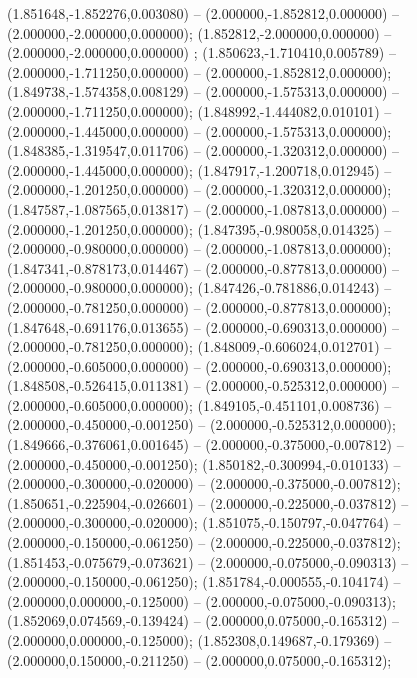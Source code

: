  (1.851648,-1.852276,0.003080) -- (2.000000,-1.852812,0.000000) -- (2.000000,-2.000000,0.000000);
 (1.852812,-2.000000,0.000000) -- (2.000000,-2.000000,0.000000) ;
 (1.850623,-1.710410,0.005789) -- (2.000000,-1.711250,0.000000) -- (2.000000,-1.852812,0.000000);
 (1.849738,-1.574358,0.008129) -- (2.000000,-1.575313,0.000000) -- (2.000000,-1.711250,0.000000);
 (1.848992,-1.444082,0.010101) -- (2.000000,-1.445000,0.000000) -- (2.000000,-1.575313,0.000000);
 (1.848385,-1.319547,0.011706) -- (2.000000,-1.320312,0.000000) -- (2.000000,-1.445000,0.000000);
 (1.847917,-1.200718,0.012945) -- (2.000000,-1.201250,0.000000) -- (2.000000,-1.320312,0.000000);
 (1.847587,-1.087565,0.013817) -- (2.000000,-1.087813,0.000000) -- (2.000000,-1.201250,0.000000);
 (1.847395,-0.980058,0.014325) -- (2.000000,-0.980000,0.000000) -- (2.000000,-1.087813,0.000000);
 (1.847341,-0.878173,0.014467) -- (2.000000,-0.877813,0.000000) -- (2.000000,-0.980000,0.000000);
 (1.847426,-0.781886,0.014243) -- (2.000000,-0.781250,0.000000) -- (2.000000,-0.877813,0.000000);
 (1.847648,-0.691176,0.013655) -- (2.000000,-0.690313,0.000000) -- (2.000000,-0.781250,0.000000);
 (1.848009,-0.606024,0.012701) -- (2.000000,-0.605000,0.000000) -- (2.000000,-0.690313,0.000000);
 (1.848508,-0.526415,0.011381) -- (2.000000,-0.525312,0.000000) -- (2.000000,-0.605000,0.000000);
 (1.849105,-0.451101,0.008736) -- (2.000000,-0.450000,-0.001250) -- (2.000000,-0.525312,0.000000);
 (1.849666,-0.376061,0.001645) -- (2.000000,-0.375000,-0.007812) -- (2.000000,-0.450000,-0.001250);
 (1.850182,-0.300994,-0.010133) -- (2.000000,-0.300000,-0.020000) -- (2.000000,-0.375000,-0.007812);
 (1.850651,-0.225904,-0.026601) -- (2.000000,-0.225000,-0.037812) -- (2.000000,-0.300000,-0.020000);
 (1.851075,-0.150797,-0.047764) -- (2.000000,-0.150000,-0.061250) -- (2.000000,-0.225000,-0.037812);
 (1.851453,-0.075679,-0.073621) -- (2.000000,-0.075000,-0.090313) -- (2.000000,-0.150000,-0.061250);
 (1.851784,-0.000555,-0.104174) -- (2.000000,0.000000,-0.125000) -- (2.000000,-0.075000,-0.090313);
 (1.852069,0.074569,-0.139424) -- (2.000000,0.075000,-0.165312) -- (2.000000,0.000000,-0.125000);
 (1.852308,0.149687,-0.179369) -- (2.000000,0.150000,-0.211250) -- (2.000000,0.075000,-0.165312);
